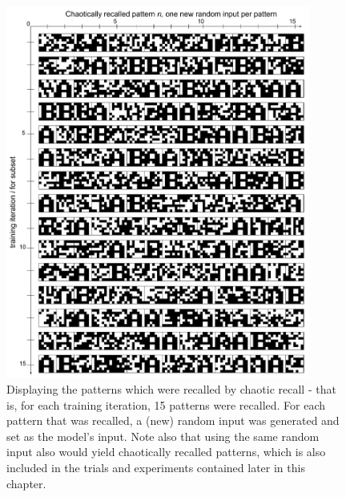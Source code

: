 \begin{figure}
    \centering
    \includegraphics[width=10cm]{fig/AB-chaotic-recall-sync-tm0-dgw25}
    \caption{Displaying the patterns which were recalled by chaotic recall - that is, for each training iteration, 15 patterns were recalled. For each pattern that was recalled, a (new) random input was generated and set as the model's input. Note also that using the same random input also would yield chaotically recalled patterns, which is also included in the trials and experiments contained later in this chapter.}
    \label{fig:chaotic_recall_sync}
\end{figure}

